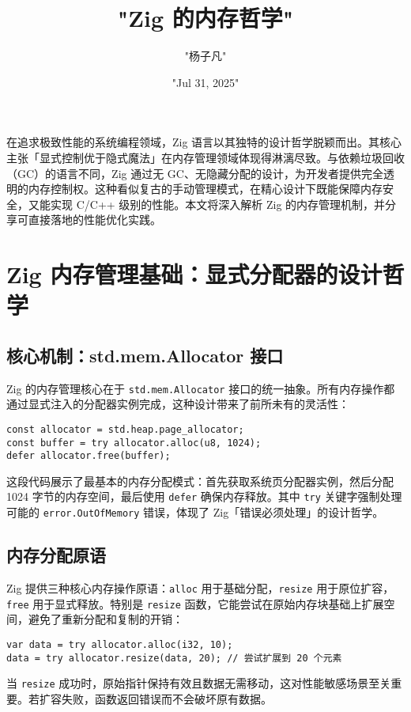 \title{"Zig 的内存哲学"}
\author{"杨子凡"}
\date{"Jul 31, 2025"}
\maketitle
在追求极致性能的系统编程领域，Zig 语言以其独特的设计哲学脱颖而出。其核心主张「显式控制优于隐式魔法」在内存管理领域体现得淋漓尽致。与依赖垃圾回收（GC）的语言不同，Zig 通过无 GC、无隐藏分配的设计，为开发者提供完全透明的内存控制权。这种看似复古的手动管理模式，在精心设计下既能保障内存安全，又能实现 C/C++ 级别的性能。本文将深入解析 Zig 的内存管理机制，并分享可直接落地的性能优化实践。\par
\chapter{Zig 内存管理基础：显式分配器的设计哲学}
\section{核心机制：std.mem.Allocator 接口}
Zig 的内存管理核心在于 \texttt{std.mem.Allocator} 接口的统一抽象。所有内存操作都通过显式注入的分配器实例完成，这种设计带来了前所未有的灵活性：\par
\begin{lstlisting}[language=zig]
const allocator = std.heap.page_allocator;
const buffer = try allocator.alloc(u8, 1024);
defer allocator.free(buffer);
\end{lstlisting}
这段代码展示了最基本的内存分配模式：首先获取系统页分配器实例，然后分配 1024 字节的内存空间，最后使用 \texttt{defer} 确保内存释放。其中 \texttt{try} 关键字强制处理可能的 \texttt{error.OutOfMemory} 错误，体现了 Zig「错误必须处理」的设计哲学。\par
\section{内存分配原语}
Zig 提供三种核心内存操作原语：\texttt{alloc} 用于基础分配，\texttt{resize} 用于原位扩容，\texttt{free} 用于显式释放。特别是 \texttt{resize} 函数，它能尝试在原始内存块基础上扩展空间，避免了重新分配和复制的开销：\par
\begin{lstlisting}[language=zig]
var data = try allocator.alloc(i32, 10);
data = try allocator.resize(data, 20); // 尝试扩展到 20 个元素
\end{lstlisting}
当 \texttt{resize} 成功时，原始指针保持有效且数据无需移动，这对性能敏感场景至关重要。若扩容失败，函数返回错误而不会破坏原有数据。\par
